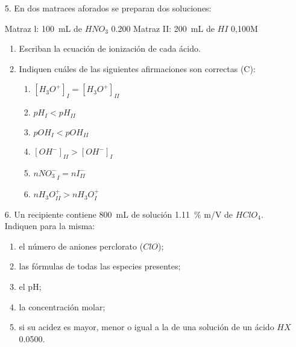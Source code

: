 \documentclass[../practica.root.tex]{subfiles}
\begin{document}
\begin{enumerate}
    \item[5.] En dos matraces aforados se preparan dos soluciones:

          Matraz l: \SI{100}{\mL} de $HNO_3$ \SI{0,200}{\MR}
          Matraz II: \SI{200}{\mL} de $HI$ 0,100M
          \begin{enumerate}
              \item Escriban la ecuación de ionización de cada ácido.
              \item Indiquen cuáles de las siguientes afirmaciones son correctas (C):
                    \begin{enumerate}
                        \item $[H_3O^+]_I = [H_3O^+]_{II}$
                        \item $pH_I < pH_{II}$
                        \item $pOH_I < pOH_{II}$
                        \item $[OH^-]_{II} > [OH^-]_I$
                        \item $n {NO_3^-}_I = nI^-_{II}$
                        \item $n H_3O^+_{II} > n H_3O^+_I$
                    \end{enumerate}
          \end{enumerate}

    \item[6.] Un recipiente contiene \SI{800}{\mL} de solución \SI{1,11}{\percent} m/V de $HClO_4$. Indiquen para la misma:
          \begin{enumerate}
              \item el número de aniones perclorato ($ClO$);
              \item las fórmulas de todas las especies presentes;
              \item el pH;
              \item la concentración molar;
              \item si su acidez es mayor, menor o igual a la de una solución de un ácido $HX$ \SI{0,0500}{\MR}.
          \end{enumerate}


\end{enumerate}
\end{document}
